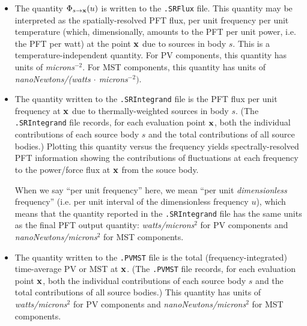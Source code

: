 \documentclass[letterpaper]{article}
\begin{document}
\begin{itemize}
  \item The quantity $\Phi_{s\to \mathbf{x}}(u)$ is written to the
        \texttt{.SRFlux} file. This quantity may be interpreted
        as the spatially-resolved PFT flux, per unit frequency 
        per unit temperature (which, dimensionally, amounts to 
        the PFT per unit power, i.e. the PFT per watt)
        at the point $\mathbf{x}$ due to sources
        in body $s.$ This is a temperature-independent quantity.
        For PV components,
        this quantity has units of \textit{microns$^{-2}$}.
        For MST components,
        this quantity has units of 
        \textit{nanoNewtons/(watts $\cdot$ microns$^{-2})$}.

  \item The quantity written to the \texttt{.SRIntegrand} file
        is the PFT flux per unit frequency at $\mathbf{x}$
        due to thermally-weighted sources in body $s$.
        (The \texttt{.SRIntegrand} file records, for each
         evaluation point $\mathbf{x}$, both the individual 
         contributions of each source body $s$ and the total 
         contributions of all source bodies.) Plotting this quantity
         versus the frequency yields spectrally-resolved
         PFT information showing the contributions of fluctuations
         at each frequency to the power/force flux at $\mathbf{x}$
         from the souce body.

         When we say ``per unit frequency'' here, we mean 
         ``per unit \textit{dimensionless} frequency'' 
         (i.e. per unit interval of the dimensionless 
          frequency $u$), which means that the quantity 
         reported in the \texttt{.SRIntegrand} file has the 
         same units as the final PFT output quantity:
         \textit{watts/microns$^2$} for PV components and 
         \textit{nanoNewtons/microns$^2$} for MST components.

  \item The quantity written to the \texttt{.PVMST} file
        is the total (frequency-integrated) time-average 
        PV or MST at $\mathbf{x}$.
        (The \texttt{.PVMST} file records, for each
         evaluation point $\mathbf{x}$, both the individual contributions
         of each source body $s$ and the total contributions
         of all source bodies.)
         This quantity has units of 
         \textit{watts/microns$^2$} for PV components and 
         \textit{nanoNewtons/microns$^2$} for MST components.
\end{itemize}
\end{document}

